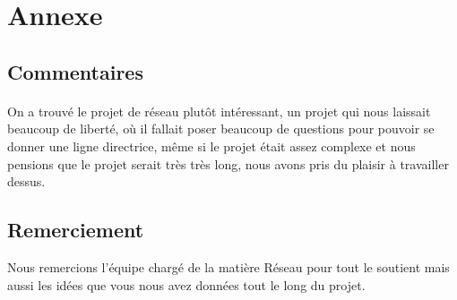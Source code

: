 \documentclass[a4paper,titlepage]{report}
\begin{document}
\section{Annexe}
\subsection{Commentaires}
\paragraph{}
On a trouvé le projet de réseau plutôt intéressant, un projet qui nous laissait beaucoup de liberté, où il fallait poser beaucoup de questions pour pouvoir se donner une ligne directrice, même si le projet était assez complexe et nous pensions que le projet serait très très long, nous avons pris du plaisir à travailler dessus.
\subsection{Remerciement}
Nous remercions l'équipe chargé de la matière Réseau pour tout le soutient mais aussi les idées que vous nous avez données tout le long du projet.
\end{document}
